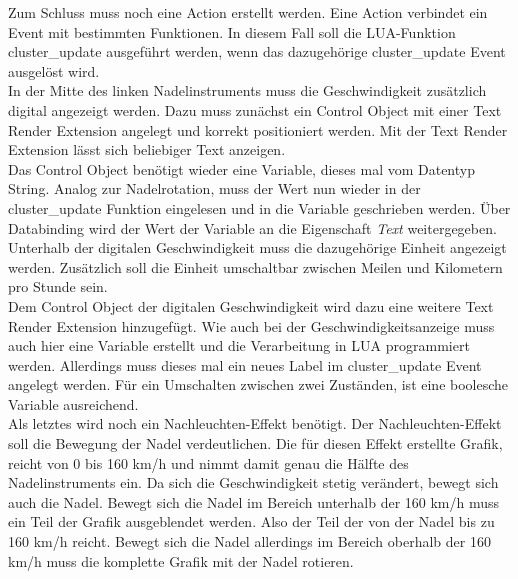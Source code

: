 Zum Schluss muss noch eine Action erstellt werden. Eine Action verbindet ein Event mit bestimmten Funktionen. In diesem Fall soll die LUA-Funktion \glqq cluster\_update\grqq{} ausgeführt werden, wenn das dazugehörige \glqq cluster\_update\grqq{} Event ausgelöst wird.\\

In der Mitte des linken Nadelinstruments muss die Geschwindigkeit zusätzlich digital angezeigt werden. Dazu muss zunächst ein Control Object mit einer Text Render Extension angelegt und korrekt positioniert werden. Mit der Text Render Extension lässt sich beliebiger Text anzeigen.\\

Das Control Object benötigt wieder eine Variable, dieses mal vom Datentyp String. Analog zur Nadelrotation, muss der Wert nun wieder in der \glqq cluster\_update\grqq{} Funktion eingelesen und in die Variable geschrieben werden. Über Databinding wird der Wert der Variable an die Eigenschaft \textit{Text} weitergegeben.\\


Unterhalb der digitalen Geschwindigkeit muss die dazugehörige Einheit angezeigt werden. Zusätzlich soll die Einheit umschaltbar zwischen Meilen und Kilometern pro Stunde sein.\\

Dem Control Object der digitalen Geschwindigkeit wird dazu eine weitere Text Render Extension hinzugefügt. Wie auch bei der Geschwindigkeitsanzeige muss auch hier eine Variable erstellt und die Verarbeitung in LUA programmiert werden. Allerdings muss dieses mal ein neues Label im \glqq cluster\_update\grqq{} Event angelegt werden. Für ein Umschalten zwischen zwei Zuständen, ist eine boolesche Variable ausreichend.\\

Als letztes wird noch ein Nachleuchten-Effekt benötigt. Der Nachleuchten-Effekt soll die Bewegung der Nadel verdeutlichen. Die für diesen Effekt erstellte Grafik, reicht von 0 bis 160 \si[per-mode=symbol]{\kilo\meter\per\hour} und nimmt damit genau die Hälfte des Nadelinstruments ein. Da sich die Geschwindigkeit stetig verändert, bewegt sich auch die Nadel. Bewegt sich die Nadel im Bereich unterhalb der 160 \si[per-mode=symbol]{\kilo\meter\per\hour} muss ein Teil der Grafik ausgeblendet werden. Also der Teil der von der Nadel bis zu 160 \si[per-mode=symbol]{\kilo\meter\per\hour} reicht. Bewegt sich die Nadel allerdings im Bereich oberhalb der 160 \si[per-mode=symbol]{\kilo\meter\per\hour} muss die komplette Grafik mit der Nadel rotieren.\\

